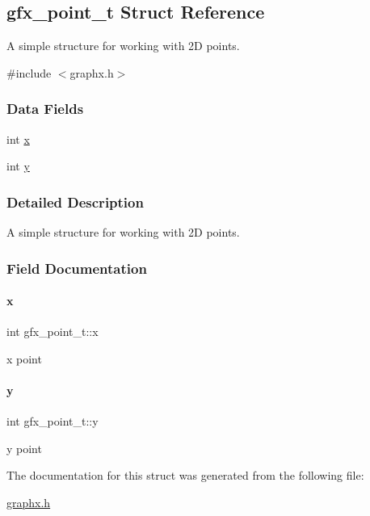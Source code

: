 \hypertarget{structgfx__point__t}{}\subsection{gfx\+\_\+point\+\_\+t Struct Reference}
\label{structgfx__point__t}


A simple structure for working with 2D points.  




{\ttfamily \#include $<$graphx.\+h$>$}

\subsubsection*{Data Fields}
\begin{DoxyCompactItemize}
\item 
int \hyperlink{structgfx__point__t_a7f695266763a8577c9b39e428e3380df}{x}
\item 
int \hyperlink{structgfx__point__t_a72f444bdc0c156546fa48edbb3ca7432}{y}
\end{DoxyCompactItemize}


\subsubsection{Detailed Description}
A simple structure for working with 2D points. 

\subsubsection{Field Documentation}
\mbox{\label{structgfx__point__t_a7f695266763a8577c9b39e428e3380df}} 
\paragraph{\texorpdfstring{x}{x}}
{\footnotesize\ttfamily int gfx\+\_\+point\+\_\+t\+::x}

x point \mbox{\label{structgfx__point__t_a72f444bdc0c156546fa48edbb3ca7432}} 
\paragraph{\texorpdfstring{y}{y}}
{\footnotesize\ttfamily int gfx\+\_\+point\+\_\+t\+::y}

y point 

The documentation for this struct was generated from the following file\+:\begin{DoxyCompactItemize}
\item 
\hyperlink{graphx_8h}{graphx.\+h}\end{DoxyCompactItemize}
